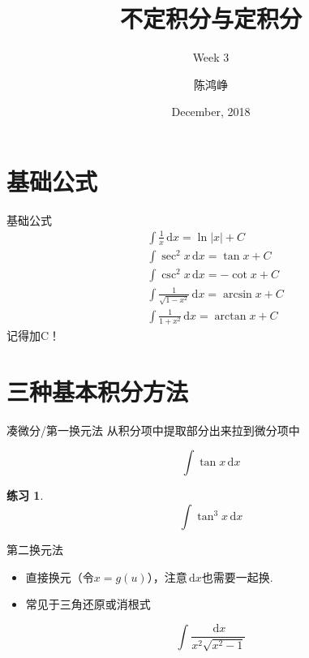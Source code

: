 \documentclass[UTF8]{ctexbeamer}
\title{不定积分与定积分}
\subtitle{Week 3}
\author[chhzh123]{陈鸿峥}
\institute[]{\small\url{https://github.com/chhzh123/Notes-of-Math/blob/master/Mathematical_analysis/main.pdf}}
\date[Dec, 2018]{December, 2018}
\def\diff{\,\mathrm{d}}
\newtheorem{exercise}[theorem]{练习} %
\begin{document}
\begin{frame}
\titlepage
\end{frame}

\begin{frame}
\tableofcontents[subsectionstyle=show]
\end{frame}

\section{基础公式}
\begin{frame}
\sectionpage
\end{frame}

\begin{frame}{基础公式}
\[\begin{aligned}
&\int\frac{1}{x}\diff x=\ln|x|+C\\
&\int\sec^2x\diff x=\tan x+C\\
&\int\csc^2x\diff x=-\cot x+C\\
&\int\frac{1}{\sqrt{1-x^2}}\diff x=\arcsin x+C\\
&\int\frac{1}{1+x^2}\diff x=\arctan x+C
\end{aligned}\]
记得加C！
\end{frame}

\section{三种基本积分方法}
\begin{frame}
\sectionpage
\end{frame}

\begin{frame}{凑微分/第一换元法}
从积分项中提取部分出来拉到微分项中
\begin{example}
\[\int\tan x\diff x\]
\end{example}
\begin{exercise}
\[\int \tan^3 x\diff x\]
\end{exercise}
\end{frame}

\begin{frame}{第二换元法}
\begin{itemize}
	\item 直接换元（令$x=g(u)$），注意$\diff x$也需要一起换.
	\item 常见于三角还原或消根式
\end{itemize}
\begin{example}[\textsection 6.2/例12]
\[\int\frac{\diff x}{x^2\sqrt{x^2-1}}\]
\end{example}
\end{frame}
\end{document}
